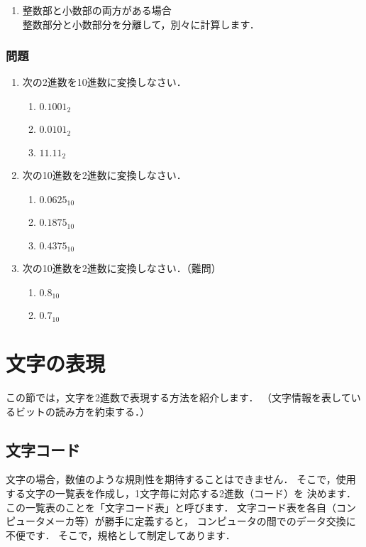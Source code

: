 \begin{enumerate}
\item 整数部と小数部の両方がある場合 \\
整数部分と小数部分を分離して，別々に計算します．
\end{enumerate}

\newpage
\subsubsection{問題}
\begin{enumerate}
\item 次の2進数を10進数に変換しなさい．
\begin{enumerate}
\item $0.1001_2$
\item $0.0101_2$
\item $11.11_2$
\end{enumerate}

\item 次の10進数を2進数に変換しなさい．
\begin{enumerate}
\item $0.0625_{10}$
\item $0.1875_{10}$
\item $0.4375_{10}$
\end{enumerate}

\item 次の10進数を2進数に変換しなさい．（難問）
\begin{enumerate}
\item $0.8_{10}$
\item $0.7_{10}$
\end{enumerate}
\end{enumerate}

\newpage
\section{文字の表現}
\label{char}

この節では，文字を2進数で表現する方法を紹介します．
（文字情報を表しているビットの読み方を約束する．）

\subsection{文字コード}
文字の場合，数値のような規則性を期待することはできません．
そこで，使用する文字の一覧表を作成し，1文字毎に対応する2進数（コード）を
決めます．
この一覧表のことを「文字コード表」と呼びます．
文字コード表を各自（コンピュータメーカ等）が勝手に定義すると，
コンピュータの間でのデータ交換に不便です．
そこで，規格として制定してあります．


